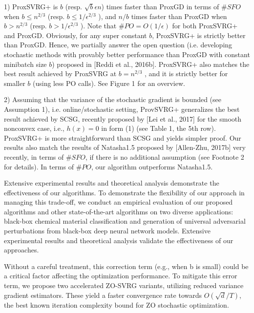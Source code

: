 \documentclass{article}
\theoremstyle{definition}
\theoremstyle{remark}
\begin{document}
{{\color{Violet}
1) ProxSVRG+ is $b$ (resp. $\sqrt{b}\epsilon n$) times faster than ProxGD in terms of $\# SFO$ when $b\leq n^{2/3}$ (resp. $b\leq 1/\epsilon^{2/3}$ ), and $n/b$ times faster than ProxGD when $b > n^{2/3}$ (resp. $b > 1/\epsilon^{2/3}$ ). Note that $\# PO = O(1/\epsilon)$ for both ProxSVRG+
and ProxGD. Obviously, for any super constant $b$, ProxSVRG+ is strictly better than ProxGD. Hence, we partially answer the open question (i.e. developing stochastic methods with provably better performance than ProxGD with constant minibatch size $b$) proposed in [Reddi et al., 2016b]. ProxSVRG+ also matches the best result achieved by
ProxSVRG at $b = n^{2/3}$ , and it is strictly better for smaller $b$ (using less PO calls). See Figure 1 for an overview.
}

{\color{Violet} 2) Assuming that the variance of the stochastic gradient is bounded (see Assumption 1), i.e. online/stochastic setting,
ProvSVRG+ generalizes the best result achieved by SCSG, recently proposed by [Lei et al., 2017] for the smooth
nonconvex case, i.e., $h(x) = 0$ in form (1) (see Table 1, the 5th row). ProxSVRG+ is more straightforward than
SCSG and yields simpler proof. Our results also match the results of Natasha1.5 proposed by [Allen-Zhu, 2017b]
very recently, in terms of $\# SFO$, if there is no additional assumption (see Footnote 2 for details). In terms of $\# PO$,
our algorithm outperforms Natasha1.5.
}


Extensive experimental results and theoretical analysis demonstrate the effectiveness of our algorithms.
{\color{Brown}
 To demonstrate the flexibility of our approach in managing this trade-off, we conduct an
empirical evaluation of our proposed algorithms and other state-of-the-art algorithms on two diverse
applications: black-box chemical material classification and generation of universal adversarial
perturbations from black-box deep neural network models. Extensive experimental results and
theoretical analysis validate the effectiveness of our approaches.
}


{\color{Brown}
 Without a
careful treatment, this correction term (e.g., when b is small) could be a critical factor affecting
the optimization performance. To mitigate this error term, we propose two accelerated ZO-SVRG
variants, utilizing reduced variance gradient estimators. These yield a faster convergence rate towards $O(\sqrt{d}/T )$, the best known iteration complexity bound for ZO stochastic optimization.
}
}
\end{document}
